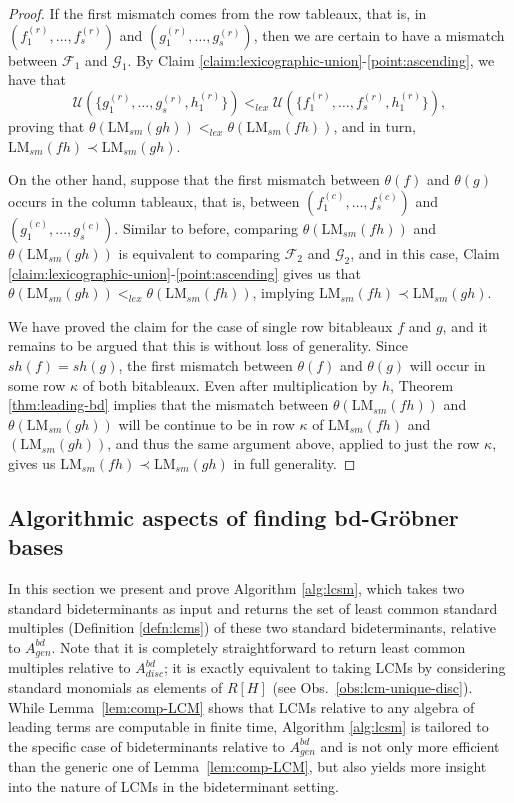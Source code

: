 \documentclass[11pt,reqno]{amsart}
\newcommand{\gb}{Gr\"{o}bner }
\newcommand{\lmsm}{\text{LM}_{sm}}
\newcommand{\shapebitab}{sh}
\theoremstyle{definition}
\numberwithin{equation}{section}
\begin{document}
\begin{proof}
If the first mismatch comes from the row tableaux, that is, in $(f^{(r)}_1, \ldots, f^{(r)}_s)$ and $(g^{(r)}_1, \ldots, g^{(r)}_s)$, then we are certain to have a mismatch between $\mathcal{F}_1$ and $\mathcal{G}_1$. By Claim \ref{claim:lexicographic-union}-\ref{point:ascending}, we have that 
\[
\mathcal{U}(\{g^{(r)}_1, \ldots, g^{(r)}_s, h^{(r)}_1\}) <_{lex} \mathcal{U}(\{f^{(r)}_1, \ldots, f^{(r)}_s, h^{(r)}_1\}),
\]
 proving that $\theta(\lmsm(gh)) <_{lex} \theta(\lmsm(fh))$, and in turn, $\lmsm(fh) \prec \lmsm(gh)$. 

On the other hand, suppose that the first mismatch between $\theta(f)$ and $\theta(g)$ occurs in the column tableaux, that is, between $(f^{(c)}_1, \ldots, f^{(c)}_s)$ and $(g^{(c)}_1, \ldots, g^{(c)}_s)$. Similar to before, comparing $\theta(\lmsm(fh))$ and $\theta(\lmsm(gh))$ is equivalent to comparing $\mathcal{F}_2$ and $\mathcal{G}_2$, and in this case, Claim \ref{claim:lexicographic-union}-\ref{point:ascending} gives us that $\theta(\lmsm(gh)) <_{lex} \theta(\lmsm(fh))$, implying $\lmsm(fh) \prec \lmsm(gh)$.

We have proved the claim for the case of single row bitableaux $f$ and $g$, and it remains to be argued that this is without loss of generality. Since $\shapebitab(f) = \shapebitab(g)$, the first mismatch between $\theta(f)$ and $\theta(g)$ will occur in some row $\kappa$ of both bitableaux. Even after multiplication by $h$, Theorem \ref{thm:leading-bd} implies that the mismatch between $\theta(\lmsm(fh))$ and $\theta(\lmsm(gh))$ will be continue to be in row $\kappa$ of $\lmsm(fh)$ and $(\lmsm(gh))$, and thus the same argument above, applied to just the row $\kappa$, gives us $\lmsm(fh) \prec \lmsm(gh)$ in full generality.
\end{proof}

\newcommand{\mset}[1]{\{\!\!\{#1\}\!\!\}}

\subsection{Algorithmic aspects of finding bd-\gb bases}
\label{sec:bd-gb-algos}

In this section we present and prove Algorithm \ref{alg:lcsm}, which takes two standard bideterminants as input and returns the set of least common standard multiples (Definition \ref{defn:lcms}) of these two standard bideterminants, relative to $A^{bd}_{gen}$. Note that it is completely straightforward to return least common multiples relative to $A_{disc}^{bd}$; it is exactly equivalent to taking LCMs by considering standard monomials as elements of $R[H]$ (see Obs.~\ref{obs:lcm-unique-disc}). While Lemma~\ref{lem:comp-LCM} shows that LCMs relative to any algebra of leading terms are computable in finite time, Algorithm \ref{alg:lcsm} is tailored to the specific case of bideterminants relative to $A_{gen}^{bd}$ and is not only more efficient than the generic one of Lemma~\ref{lem:comp-LCM}, but also yields more insight into the nature of LCMs in the bideterminant setting.
\end{document}
